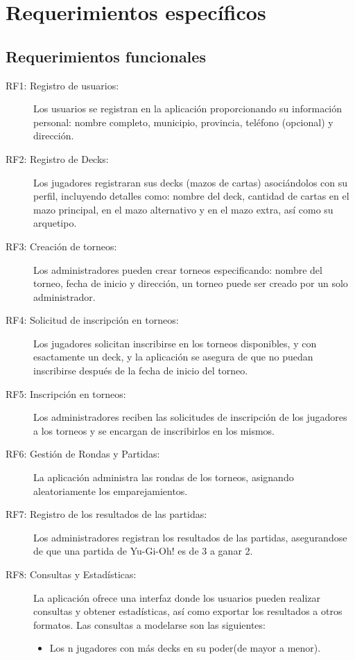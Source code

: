 \documentclass[a4paper]{article}
\begin{document}
\newpage
\section{Requerimientos espec\'ificos}
\subsection{Requerimientos funcionales}
\begin{description}

	\item[RF1: Registro de usuarios:] Los usuarios se registran en la aplicación proporcionando su información personal: nombre completo, municipio, provincia, teléfono (opcional) y dirección.
	\item[RF2: Registro de Decks:] Los jugadores registraran sus decks (mazos de cartas) asoci\'andolos con su perfil, incluyendo detalles como: nombre del deck, cantidad de cartas en el mazo principal, en el mazo alternativo y en el mazo extra, así como su arquetipo.
	\item[RF3: Creaci\'on de torneos:] Los administradores pueden crear torneos especificando: nombre del torneo, fecha de inicio y dirección, un torneo puede ser creado por un solo administrador.
	\item[RF4: Solicitud de inscripci\'on en torneos:] Los jugadores solicitan inscribirse en los torneos disponibles, y con esactamente un deck, y la aplicaci\'on se asegura de que no puedan inscribirse despu\'es de la fecha de inicio del torneo. 
	\item[RF5: Inscripci\'on en torneos:] Los administradores reciben las solicitudes de inscripci\'on de los jugadores a los torneos y se encargan de inscribirlos en los mismos.
    \item[RF6: Gestión de Rondas y Partidas:] La aplicaci\'on administra las rondas de los torneos, asignando aleatoriamente los emparejamientos.
    \item[RF7: Registro de los resultados de las partidas:] Los administradores registran los resultados de las partidas, asegurandose de que una partida de Yu-Gi-Oh! es de 3 a ganar 2.
    \item[RF8: Consultas y Estad\'isticas:] La aplicaci\'on ofrece una interfaz donde los usuarios pueden realizar consultas y obtener estad\'isticas, as\'i como exportar los resultados a otros formatos. Las consultas a modelarse son las siguientes:
    \begin{itemize}
    \item Los n jugadores con m\'as decks en su poder(de mayor a menor).

\end{itemize}
\end{description}
\end{document}
